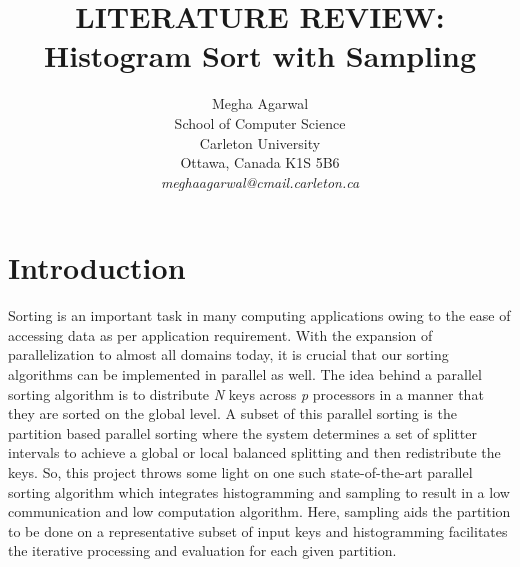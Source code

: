 \documentclass[11pt]{article}       %
\begin{document}


\title{LITERATURE REVIEW: Histogram Sort with Sampling}


\author{
Megha Agarwal\\
School of Computer Science\\
Carleton University\\
Ottawa, Canada K1S 5B6\\
{\em meghaagarwal@cmail.carleton.ca}
} %

\maketitle



\section{Introduction} \label{intro}

Sorting is an important task in many computing applications owing to the ease of accessing data as per application requirement. With the expansion of parallelization to almost all domains today, it is crucial that our sorting algorithms can be implemented in parallel as well. The idea behind a parallel sorting algorithm is to distribute \emph N keys across \emph p processors in a manner that they are sorted on the global level. A subset of this parallel sorting is the partition based parallel sorting where the system determines a set of splitter intervals to achieve a global or local balanced splitting and then redistribute the keys. So, this project throws some light on one such state-of-the-art parallel sorting algorithm which integrates histogramming and sampling to result in a low communication and low computation algorithm. Here, sampling aids the partition to be done on a representative subset of input keys and histogramming facilitates the iterative processing and evaluation for each given partition.
\end{document}
